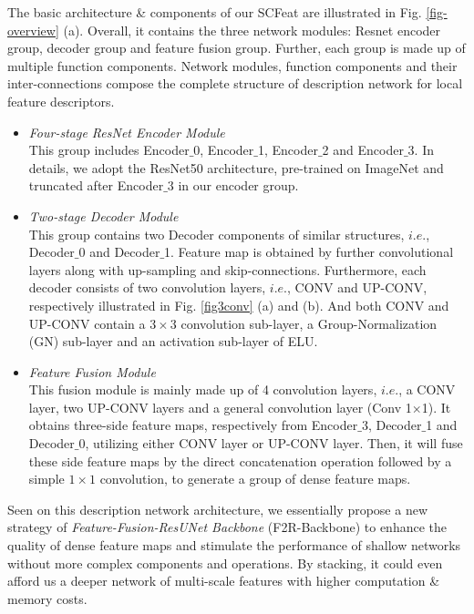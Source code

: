 \documentclass[journal]{IEEEtran}
\begin{document}
The basic architecture \& components of our SCFeat are illustrated in Fig. \ref{fig-overview} (a). Overall, it contains the three network modules: Resnet encoder group, decoder group and feature fusion group. Further, each group is made up of multiple function components.
Network modules, function components and their inter-connections compose the complete structure of description network for local feature descriptors.










\begin{itemize}
\item{
\emph{Four-stage ResNet Encoder Module}\\ This group includes Encoder$\_$0, Encoder$\_$1, Encoder$\_$2 and Encoder$\_$3. In details, we adopt the ResNet50 \cite{resnet} architecture, pre-trained on ImageNet and truncated after Encoder$\_$3 in our encoder group.
}
\item{
\emph{Two-stage Decoder Module}\\ 
This group contains two Decoder components of similar structures, $i.e.$, Decoder$\_$0 and Decoder$\_$1. Feature map is obtained by further convolutional layers along with up-sampling and skip-connections. Furthermore, each decoder consists of two convolution layers, $i.e.$, CONV and UP-CONV, respectively illustrated in Fig. \ref{fig3conv} (a) and (b). And both CONV and UP-CONV contain a $3\times3$ convolution sub-layer, a Group-Normalization (GN) sub-layer \cite{GN} and an activation sub-layer of ELU.
}
\item{
\emph{Feature Fusion Module}\\
This fusion module is mainly made up of 4 convolution layers, $i.e.$, a CONV layer, two UP-CONV layers and a general convolution layer (Conv 1$\times$1). It obtains three-side feature maps, respectively from Encoder$\_$3, Decoder$\_$1 and Decoder$\_$0, utilizing either CONV layer or UP-CONV layer. Then, it will fuse these side feature maps by the direct concatenation operation followed by a simple $1\times1$ convolution, to generate a group of dense feature maps. 
}
\end{itemize}

Seen on this description network architecture, we essentially propose a new strategy of \emph{Feature-Fusion-ResUNet Backbone} (F2R-Backbone) to enhance the quality of dense feature maps and stimulate the performance of shallow networks without more complex components and operations. By stacking, it could even afford us a deeper network of multi-scale features with higher computation \& memory costs. 
\end{document}
